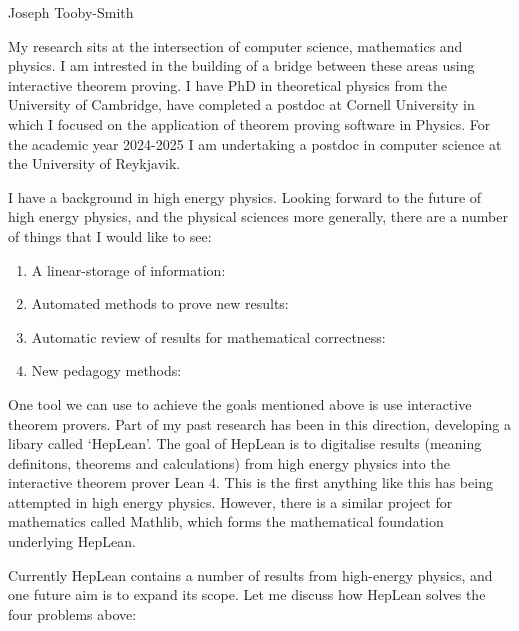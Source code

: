 \documentclass[12pt,letter]{article}
\newcounter{customtitle}
\begin{document}
\vspace{-1cm}
\begin{flushright}
{{\Large \color{white}Joseph Tooby-Smith }}
\end{flushright}
\vspace{0.4cm}

My research sits at the intersection of computer science, 
mathematics and physics.
I am intrested in the building of a bridge between these areas using 
interactive theorem proving. I have PhD in theoretical physics 
from the University of Cambridge, 
have completed a postdoc at Cornell University in which I focused on the 
application of theorem proving software in Physics. For the academic 
year 2024-2025 I am undertaking a postdoc in computer science at the 
University of Reykjavik.

I have a background in high energy physics. Looking forward to the future of high energy physics, and the physical sciences more generally, there are a number of things that I would like to see: 

\begin{enumerate}
\item A linear-storage of information:
\item Automated methods to prove new results:
\item Automatic review of results for mathematical correctness: 
\item New pedagogy methods:	
\end{enumerate}


One tool we can use to achieve the goals mentioned above is use interactive theorem provers. Part of my past research has been in this direction, developing a libary called `HepLean'. The goal of HepLean is to digitalise results 
(meaning definitons, theorems and calculations)
from high energy physics into 
the interactive theorem prover Lean 4. This is the first anything like this has being attempted
in high energy physics. However, there is a similar project for mathematics called Mathlib, which forms the mathematical foundation underlying HepLean.

Currently HepLean contains a number of results from high-energy physics, and one future aim is to expand its scope. Let me discuss how HepLean solves the four problems above: 
\end{document}
